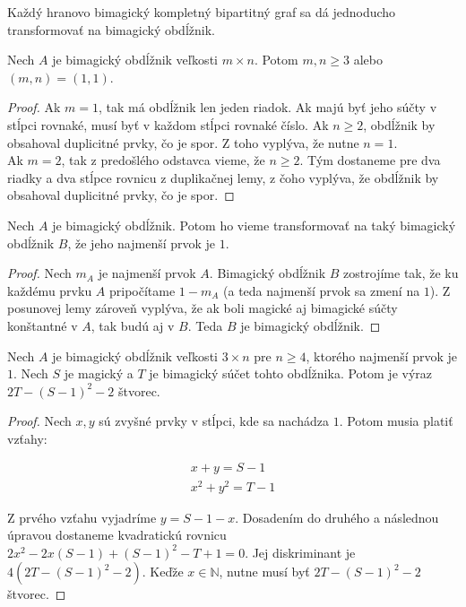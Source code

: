 Každý hranovo bimagický kompletný bipartitný graf sa dá jednoducho transformovať na bimagický obdĺžnik. \\

\begin{subtheorem}
\label{rectanglemn}
Nech $A$ je bimagický obdĺžnik veľkosti $m \times n$. Potom $m,n \geq 3$ alebo $(m, n) = (1, 1)$.
\end{subtheorem}

\begin{proof} Ak $m = 1$, tak má obdĺžnik len jeden riadok. Ak majú byť jeho súčty v stĺpci rovnaké, musí byť v každom stĺpci rovnaké číslo. Ak $n \geq 2$, obdĺžnik by obsahoval duplicitné prvky, čo je spor. Z toho vyplýva, že nutne $n = 1$. \\

Ak $m = 2$, tak z predošlého odstavca vieme, že $n \geq 2$. Tým dostaneme pre dva riadky a dva stĺpce rovnicu z duplikačnej lemy, z čoho vyplýva, že obdĺžnik by obsahoval duplicitné prvky, čo je spor.
\end{proof}

\begin{subtheorem} 
\label{rectangle1}
Nech $A$ je bimagický obdĺžnik. Potom ho vieme transformovať na taký bimagický obdĺžnik $B$, že jeho najmenší prvok je $1$.
\end{subtheorem}

\begin{proof} Nech $m_A$ je najmenší prvok $A$. Bimagický obdĺžnik $B$ zostrojíme tak, že ku každému prvku $A$ pripočítame $1 - m_A$ (a teda najmenší prvok sa zmení na $1$). Z posunovej lemy zároveň vyplýva, že ak boli magické aj bimagické súčty konštantné v $A$, tak budú aj v $B$. Teda $B$ je bimagický obdĺžnik.
\end{proof}

\begin{subtheorem} 
\label{rectangle1cond}
Nech $A$ je bimagický obdĺžnik veľkosti $3 \times n$ pre $n \geq 4$, ktorého najmenší prvok je $1$. Nech $S$ je magický a $T$ je bimagický súčet tohto obdĺžnika. Potom je výraz $2T - (S-1)^2 - 2$ štvorec.
\end{subtheorem}

\begin{proof}
Nech $x,y$ sú zvyšné prvky v stĺpci, kde sa nachádza $1$. Potom musia platiť vzťahy:

\begin{gather}
x + y = S - 1 \\
x^2 + y^2 = T - 1
\end{gather}

Z prvého vzťahu vyjadríme $y = S - 1 - x$. Dosadením do druhého a následnou úpravou dostaneme kvadratickú rovnicu $2x^2 - 2x(S - 1) + (S - 1)^2 - T + 1 = 0$. Jej diskriminant je $4(2T - (S - 1)^2 - 2)$. Keďže $x \in \mathbb{N}$, nutne musí byť $2T - (S - 1)^2 - 2$ štvorec.

\end{proof}

